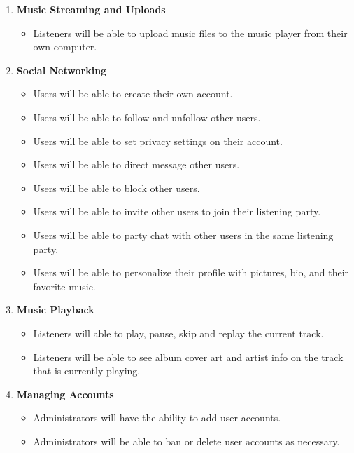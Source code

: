 \documentclass[12pt]{report}
\begin{document}
\begin{enumerate}
   \item \textbf{Music Streaming and Uploads}
       \begin{itemize}
           \item Listeners will be able to upload music files to the music player from their own computer.
       \end{itemize}
    \item \textbf{Social Networking}
        \begin{itemize}
            \item Users will be able to create their own account.
            \item Users will be able to follow and unfollow other users.
            \item Users will be able to set privacy settings on their account.
            \item Users will be able to direct message other users.
            \item Users will be able to block other users.
            \item Users will be able to invite other users to join their listening party.
            \item Users will be able to party chat with other users in the same listening party.
            \item Users will be able to personalize their profile with pictures, bio, and their favorite music.       
        \end{itemize}
    \item\textbf{Music Playback}
        \begin{itemize}
            \item Listeners will able to play, pause, skip and replay the current track.
            \item Listeners will be able to see album cover art and artist info on the track that is currently playing.
        \end{itemize}
    \item\textbf{Managing Accounts}
        \begin{itemize}
            \item Administrators will have the ability to add user accounts.
            \item Administrators will be able to ban or delete user accounts as necessary.
        \end{itemize}
\end{enumerate}
\end{document}
